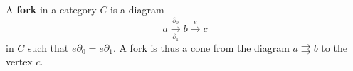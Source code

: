 A \textbf{fork} in a category $C$ is a diagram
$$a \xrightarrow[\partial_1]{\partial_0} b \xrightarrow{e} c$$
in $C$ such that $e \partial_0 = e \partial_1$. A fork is thus a cone from the diagram $a \rightrightarrows b$ to the vertex $c$.
